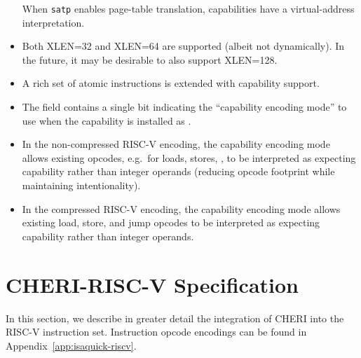 \begin{itemize}
  When \texttt{satp} enables page-table translation, capabilities have a
  virtual-address interpretation.
\item Both XLEN=32 and XLEN=64 are supported (albeit not dynamically).
  In the future, it may be desirable to also support XLEN=128.
\item A rich set of atomic instructions is extended with capability
  support.
\item The \cflags{} field contains a single bit indicating the ``capability
  encoding mode'' to use when the capability is installed as \PCC{}.
\item In the non-compressed RISC-V encoding, the capability encoding mode
  allows existing opcodes, e.g.\ for loads, stores, ,
  to be interpreted as expecting capability rather than integer operands
  (reducing opcode footprint while maintaining intentionality).
\item In the compressed RISC-V encoding, the capability encoding mode allows
  existing load, store, and jump opcodes to be interpreted as expecting
  capability rather than integer operands.

%
\end{itemize}

\section{CHERI-RISC-V Specification}

In this section, we describe in greater detail the integration of CHERI into
the RISC-V instruction set.
Instruction opcode encodings can be found in
Appendix~\ref{app:isaquick-riscv}.

